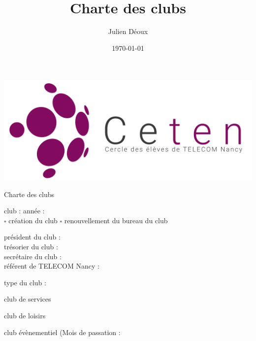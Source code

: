\documentclass{article} %
\title{Charte des clubs}
\author{Julien Déoux}
\date\today
\begin{document}
	
	\begin{titlepage}
		\begin{center}
			\includegraphics[width=\textwidth]{images/ceten.png}\par
			\vspace{0.5cm}
			{\Huge \light Charte des clubs}\par
			\vspace{1cm}
		\end{center}
		\begin{center}
			club : \underline{\hspace{8cm}}
			année : \underline{\hspace{1.5cm}}\\
			\vspace{\baselineskip}
			$\square$ création du club
			\hspace{3cm}
			$\square$ renouvellement du bureau du club\\
			\vspace{\baselineskip}
			\begin{spacing}{1.5}
				président du club : \underline{\hspace{7cm}}\\
				trésorier du club : \underline{\hspace{7cm}}\\
				secrétaire du club : \underline{\hspace{7cm}}\\
				référent de TELECOM Nancy : \underline{\hspace{7cm}}\\
			\end{spacing}
		\end{center}
		type du club :
		\begin{todolist}
		\item club de services
		\item club de loisirs
		\item club évènementiel (Mois de passation :

\end{todolist}
\end{titlepage}
\end{document}
